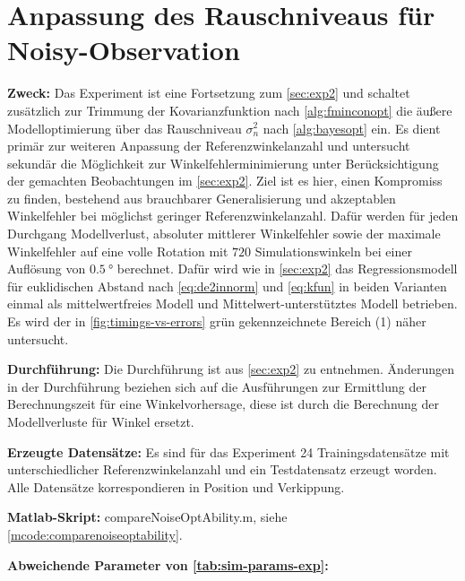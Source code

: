 %

\section{Anpassung des Rauschniveaus für Noisy-Observation}\label{sec:exp3}


\textbf{Zweck:} Das Experiment ist eine Fortsetzung zum \autoref{sec:exp2} und schaltet zusätzlich zur Trimmung der Kovarianzfunktion nach \autoref{alg:fminconopt} die äußere Modelloptimierung über das Rauschniveau $\sigma_n^2$ nach \autoref{alg:bayesopt} ein. Es dient primär zur weiteren Anpassung der Referenzwinkelanzahl und untersucht sekundär die Möglichkeit zur Winkelfehlerminimierung unter Berücksichtigung der gemachten Beobachtungen im \autoref{sec:exp2}. Ziel ist es hier, einen Kompromiss zu finden, bestehend aus brauchbarer Generalisierung und akzeptablen Winkelfehler bei möglichst geringer Referenzwinkelanzahl. Dafür werden für jeden Durchgang Modellverlust, absoluter mittlerer Winkelfehler sowie der maximale Winkelfehler auf eine volle Rotation mit $720$ Simulationswinkeln bei einer Auflösung von $\SI{0,5}{\degree}$ berechnet. Dafür wird wie in \autoref{sec:exp2} das Regressionsmodell für euklidischen Abstand nach \autoref{eq:de2innorm} und \autoref{eq:kfun} in beiden Varianten einmal als mittelwertfreies Modell und Mittelwert-unterstütztes Modell betrieben. Es wird der in \autoref{fig:timings-vs-errors} grün gekennzeichnete Bereich (1) näher untersucht.

\textbf{Durchführung:} Die Durchführung ist aus \autoref{sec:exp2} zu entnehmen. Änderungen in der Durchführung beziehen sich auf die Ausführungen zur Ermittlung der Berechnungszeit für eine Winkelvorhersage, diese ist durch die Berechnung der Modellverluste für Winkel ersetzt.

\textbf{Erzeugte Datensätze:} Es sind für das Experiment 24 Trainingsdatensätze mit unterschiedlicher Referenzwinkelanzahl und ein Testdatensatz erzeugt worden. Alle Datensätze korrespondieren in Position und Verkippung.

\textbf{Matlab-Skript:} compareNoiseOptAbility.m, siehe \autoref{mcode:comparenoiseoptability}.

\textbf{Abweichende Parameter von \autoref{tab:sim-params-exp}:}

